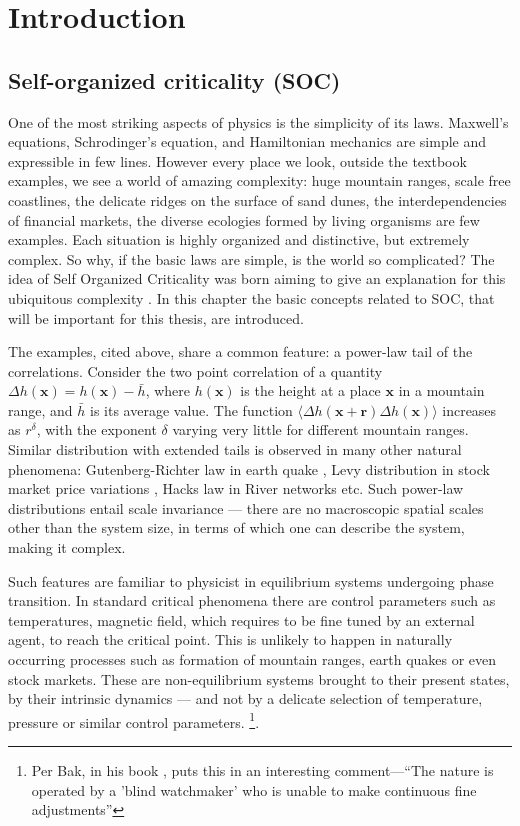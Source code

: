 \documentclass[11pt,a4paper]{book}
\begin{document}
\chapter{Introduction}\label{ch:intro}
\section{Self-organized criticality (SOC)}
One of the most striking aspects of physics is the simplicity of its
laws. Maxwell's equations, Schrodinger's equation, and Hamiltonian
mechanics are simple and expressible in few lines. However every place
we look, outside the textbook examples, we see a world of amazing complexity:
huge mountain ranges, scale free coastlines, the delicate ridges on the surface of sand dunes,
the interdependencies of financial markets, the
diverse ecologies formed by living organisms are few examples. Each situation is
highly organized and distinctive, but extremely complex.
So why, if the basic laws are simple, is the world so complicated? The idea of Self
Organized Criticality was born aiming to give an explanation for this
ubiquitous complexity \cite{jensen}. In this chapter the basic
concepts related to SOC, that will be
important for this thesis, are introduced.

The examples, cited above, share
a common feature: a power-law tail of the correlations. Consider the
two point correlation of a quantity $\Delta h\left(\mathbf{x} \right)=h\left( \mathbf{x} \right)-\bar{h}$, where $h\left( \mathbf{x}
\right)$ is the height at a place $\mathbf{x}$ in a mountain range, and
$\bar{h}$ is its average value. The function $\langle \Delta
h(\mathbf{x+r})\Delta h(\mathbf{x}) \rangle$
increases as $r^{\delta}$, with the exponent $\delta$ varying very
little for different mountain ranges. Similar distribution with
extended tails is observed in many other natural phenomena:
Gutenberg-Richter law in earth quake \cite{gutenberg}, Levy
distribution in stock market price variations \cite{levy}, Hacks law in River networks \cite{hackslaw1,hackslaw2} etc. Such power-law
distributions entail scale invariance --- there are no macroscopic
spatial scales other than the system size,
in terms of which one can describe the system, making it complex.

Such features are familiar to physicist in equilibrium systems undergoing phase
transition. In standard critical phenomena there are control
parameters such as temperatures, magnetic field, which requires to be
fine tuned by an external agent, to reach the critical point. This is
unlikely to happen in naturally occurring processes such as formation
of mountain ranges, earth quakes or even stock markets. These are
non-equilibrium systems brought to their present states, by their
intrinsic dynamics --- and not by a delicate selection of temperature,
pressure or similar control parameters. \footnote{Per Bak, in his
book \cite{blind}, puts this in an interesting comment---``The nature is
operated by a 'blind watchmaker' who is unable to make continuous fine
adjustments''}.
\end{document}

